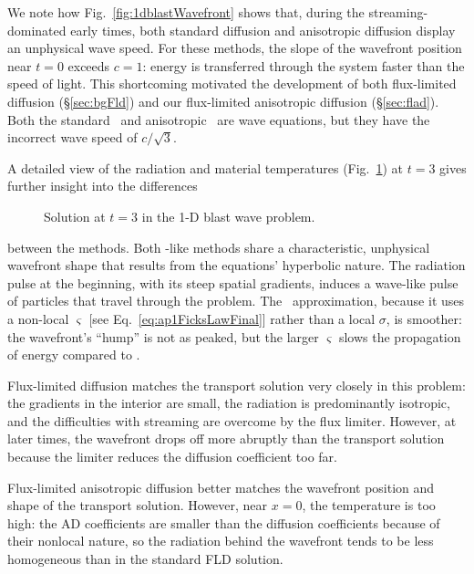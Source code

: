We note how Fig.~\ref{fig:1dblastWavefront}
shows that, during the streaming-dominated early times, both standard diffusion
and anisotropic diffusion display an unphysical wave speed. For these methods,
the slope of the wavefront position near $t=0$ exceeds $c=1$: energy is
transferred through the system faster than the speed of light. This
shortcoming motivated the development of both flux-limited diffusion
(\S\ref{sec:bgFld}) and our flux-limited anisotropic diffusion
(\S\ref{sec:flad}). Both the standard \Pone\ and anisotropic \Pone\ are wave
equations, but they have the incorrect wave speed of $c/\sqrt{3}$.

A detailed view of the radiation and material temperatures
(Fig.~\ref{fig:1dblastTemp}) at $t=3$ gives further insight into the differences
%
\begin{figure}[tb]
  \centering\small
  \centering
  \caption{Solution at $t=3$ in the 1-D blast wave problem.}
  \label{fig:1dblastTemp}
\end{figure}
%
between the methods.
Both \Pone-like methods share a characteristic, unphysical wavefront shape
that results from the equations' hyperbolic nature.
The radiation pulse at the beginning, with its steep spatial gradients,
induces a wave-like pulse of particles that travel through the problem. The
\APone\ approximation, because it uses a non-local $\varsigma$ [see
Eq.~\eqref{eq:ap1FicksLawFinal}] rather than a local $\sigma$, is smoother: the
wavefront's ``hump''
is not as peaked, but the larger $\varsigma$ slows the propagation of energy
compared to \Pone.

Flux-limited diffusion matches the transport solution very closely in this
problem: the gradients in the interior are small, the radiation is predominantly
isotropic, and the difficulties with streaming are overcome by the flux limiter.
However, at later times, the wavefront drops off more abruptly than the
transport solution because the limiter reduces the diffusion coefficient too
far.

Flux-limited anisotropic diffusion better matches the wavefront position and
shape of the transport solution. However, near $x=0$, the temperature is too
high: the AD coefficients are smaller than the diffusion coefficients
because of their nonlocal nature, so the radiation behind the wavefront tends to
be less homogeneous than in the standard FLD solution.

